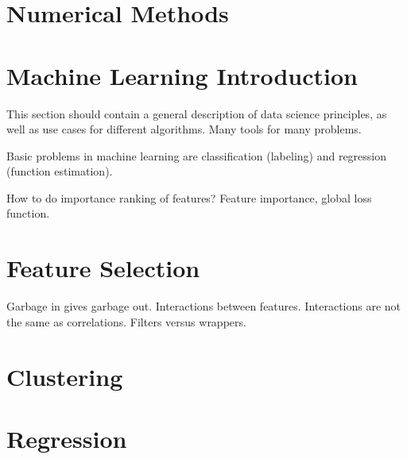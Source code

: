 \documentclass[
10pt, %
a4paper, %
oneside, %
headinclude,footinclude, %
BCOR5mm, %
]{scrartcl}
\begin{document}
\section{Numerical Methods}

\section{Machine Learning Introduction}

This section should contain a general description of data science principles, as well as use cases for different algorithms. Many tools for many problems. 

Basic problems in machine learning are classification (labeling) and regression (function estimation). 

How to do importance ranking of features? Feature importance, global loss function.
\section{Feature Selection}

Garbage in gives garbage out. 
Interactions between features. Interactions are not the same as correlations.
Filters versus wrappers.

\section{Clustering}

\section{Regression}
\end{document}
